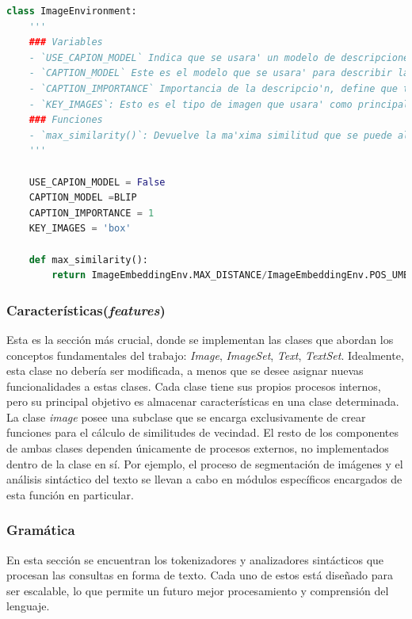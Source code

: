 \begin{lstlisting}[language=Python]
class ImageEnvironment:
    '''    
    ### Variables 
    - `USE_CAPION_MODEL` Indica que se usara' un modelo de descripciones de ima'genes
    - `CAPTION_MODEL` Este es el modelo que se usara' para describir la ima'gen
    - `CAPTION_IMPORTANCE` Importancia de la descripcio'n, define que tan importante ser la descripcio'n de una imagen para la similitud. Valor=1 indica que tiene igual importancia que la imagen.
    - `KEY_IMAGES`: Esto es el tipo de imagen que usara' como principal. (box or mask).
    ### Funciones
    - `max_similarity()`: Devuelve la ma'xima similitud que se puede alcanzar en la distancia entre dos ima'genes. 
    '''

    USE_CAPION_MODEL = False
    CAPTION_MODEL =BLIP
    CAPTION_IMPORTANCE = 1
    KEY_IMAGES = 'box'

    def max_similarity():
        return ImageEmbeddingEnv.MAX_DISTANCE/ImageEmbeddingEnv.POS_UMBRAL

\end{lstlisting}

\subsubsection{Caracter\'isticas(\textit{features})}
Esta es la sección m\'as crucial, donde se implementan las clases que abordan los conceptos fundamentales del trabajo: \textit{Image}, \textit{ImageSet}, \textit{Text}, \textit{TextSet}. Idealmente, esta clase no debería ser modificada, a menos que se desee asignar nuevas funcionalidades a estas clases. Cada clase tiene sus propios procesos internos, pero su principal objetivo es almacenar características en una clase determinada. 
La clase \textit{image } posee una subclase que se encarga exclusivamente de crear funciones para el c\'alculo de similitudes de vecindad. El resto de los componentes de ambas clases dependen únicamente de procesos externos, no implementados dentro de la clase en sí. Por ejemplo, el proceso de segmentación de im\'agenes y el an\'alisis sint\'actico del texto se llevan a cabo en módulos específicos encargados de esta función en particular.

\subsubsection{Gram\'atica}
En esta sección se encuentran los tokenizadores y analizadores sint\'acticos que procesan las consultas en forma de texto. Cada uno de estos est\'a diseñado para ser escalable, lo que permite un futuro mejor procesamiento y comprensión del lenguaje.


